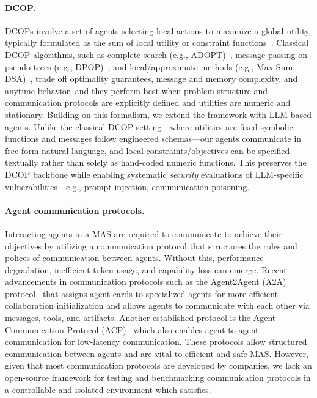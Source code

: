 \paragraph{DCOP.} DCOPs involve a set of agents selecting local actions to maximize a global utility, typically formulated as the sum of local utility or constraint functions~\citep{fioretto2018survey}. Classical DCOP algorithms, such as complete search (e.g., ADOPT)~\citep{modi2005adopt}, message passing on pseudo-trees (e.g., DPOP)~\citep{petcu2005dpop}, and local/approximate methods (e.g., Max-Sum, DSA)~\citep{farinelli2008maxsum,zhang2005dsa}, trade off optimality guarantees, message and memory complexity, and anytime behavior, and they perform best when problem structure and communication protocols are explicitly defined and utilities are numeric and stationary. Building on this formalism, we extend the framework with LLM-based agents. Unlike the classical DCOP setting—where utilities are fixed symbolic functions and messages follow engineered schemas—our agents communicate in free-form natural language, and local constraints/objectives can be specified textually rather than solely as hand-coded numeric functions. This preserves the DCOP backbone while enabling systematic \emph{security} evaluations of LLM-specific vulnerabilities—e.g., prompt injection, communication poisoning.

\paragraph{Agent communication protocols.} Interacting agents in a MAS are required to communicate to achieve their objectives by utilizing a communication protocol that structures the rules and polices of communication between agents. Without this, performance degradation, inefficient token usage, and capability loss can emerge. Recent advancements in communication protocols such as the Agent2Agent (A2A) protocol~\citep{a2aprotocolProtocol} that assigns agent cards to specialized agents for more efficient collaboration initialization and allows agents to communicate with each other via messages, tools, and artifacts. Another established protocol is the Agent Communication Protocol (ACP)~\citep{githubGitHubIBMACP} which also enables agent-to-agent communication for low-latency communication. These protocols allow structured communication between agents and are vital to efficient and safe MAS. However, given that most communication protocols are developed by companies, we lack an open-source framework for testing and benchmarking communication protocols in a controllable and isolated environment which \sys satisfies.

